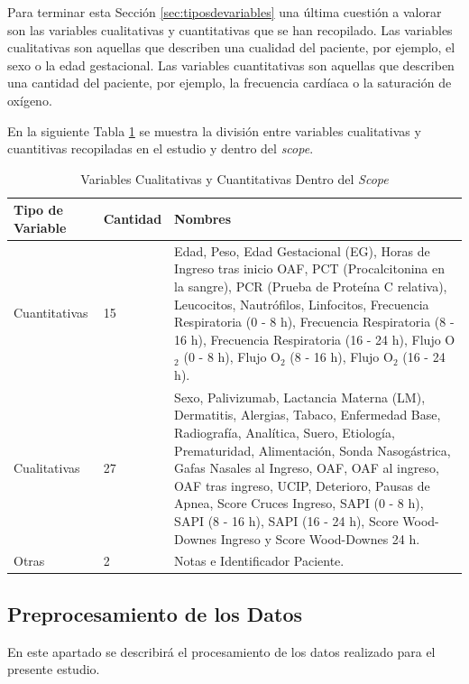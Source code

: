 Para terminar esta Sección \ref{sec:tiposdevariables} una última cuestión a valorar son las variables cualitativas y cuantitativas que se han recopilado. Las variables cualitativas son aquellas que describen una cualidad del paciente, por ejemplo, el sexo o la edad gestacional. Las variables cuantitativas son aquellas que describen una cantidad del paciente, por ejemplo, la frecuencia cardíaca o la saturación de oxígeno.

En la siguiente Tabla \ref{tabla:cuali_cuanti} se muestra la división entre variables cualitativas y cuantitivas recopiladas en el estudio y dentro del \textit{scope}.

\begin{table}[H]
    \centering
        \begin{tabular}{| m{5cm} | m{1.75cm} | m{7cm} |}
            \hline Tipo de Variable & Cantidad & Nombres  \\ \hline
            Cuantitativas & 15 & Edad, Peso, Edad Gestacional (EG), Horas de Ingreso tras inicio OAF, PCT (Procalcitonina en la sangre), PCR (Prueba de Proteína C relativa), Leucocitos, Nautrófilos, Linfocitos, Frecuencia Respiratoria (0 - 8 h), Frecuencia Respiratoria (8 - 16 h),
            Frecuencia Respiratoria (16 - 24 h),
            Flujo O$_2$ (0 - 8 h),
            Flujo O$_2$ (8 - 16 h),
            Flujo O$_2$ (16 - 24 h). \\ \hline
            Cualitativas & 27 & Sexo, Palivizumab, Lactancia Materna (LM), Dermatitis, Alergias, Tabaco, Enfermedad Base, Radiografía, Analítica, Suero, Etiología, Prematuridad, Alimentación, Sonda Nasogástrica, Gafas Nasales al Ingreso, OAF, OAF al ingreso, OAF tras ingreso, UCIP, Deterioro, Pausas de Apnea, Score Cruces Ingreso, SAPI (0 - 8 h),
            SAPI (8 - 16 h), 
            SAPI (16 - 24 h), Score Wood-Downes Ingreso y Score Wood-Downes 24 h. \\ \hline
            Otras & 2 & Notas e Identificador Paciente. \\ \hline
        \end{tabular}
    \caption{Variables Cualitativas y Cuantitativas Dentro del \textit{Scope}}\label{tabla:cuali_cuanti}
\end{table}

\subsection{Preprocesamiento de los Datos}

En este apartado se describirá el procesamiento de los datos realizado para el presente estudio.

